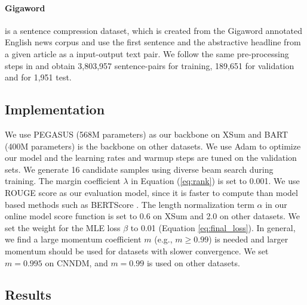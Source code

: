 \documentclass{article}
\begin{document}
\paragraph{Gigaword} is a sentence compression dataset, which is created from the Gigaword annotated English news corpus \cite{napoles2012annotated} and use the first sentence and the abstractive headline from a given article as a input-output text pair. We follow the same pre-processing steps in \cite{rush2015neural} and  obtain 3,803,957 sentence-pairs for training, 189,651 for validation and for 1,951 test.

\subsection{Implementation}
We use PEGASUS \cite{zhang:2019:icml} (568M parameters) as our backbone on XSum and BART \cite{lewis-etal-2020-bart} (400M parameters) is the backbone on other datasets. We use Adam \cite{kingma2014adam} to optimize our model and the learning rates and warmup steps are tuned on the validation sets. We generate 16 candidate samples using diverse beam search \cite{vijayakumar:2016:arxiv} during training. The margin coefficient $\lambda$ in Equation (\ref{eq:rank}) is set to 0.001. We use ROUGE score \cite{lin-2004-rouge} as our evaluation model, since it is faster to compute than model based methods such as BERTScore \cite{zhang2019bertscore}. The length normalization term $\alpha$ in our online model score function is set to 0.6 on XSum and 2.0 on other datasets. We set the weight for the MLE loss $\beta$ to 0.01 (Equation \ref{eq:final_loss}). In general, we find a large momentum coefficient $m$ (e.g., $m \ge 0.99$) is needed and larger momentum should be used for datasets with slower convergence.
We set $m=0.995$ on CNNDM, and $m=0.99$ is used on other datasets.

\subsection{Results}
\end{document}
